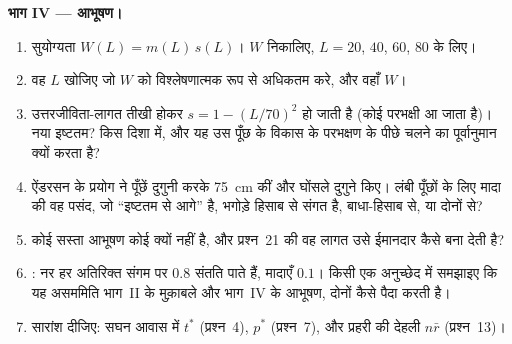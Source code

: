 \begin{problem}
\medskip
\noindent\textbf{भाग IV --- आभूषण।}
\begin{enumerate}[resume]
  \item सुयोग्यता $W(L) = m(L)\,s(L)$। $W$ निकालिए, $L = 20$, $40$, $60$,
        $80$ के लिए।
  \item वह $L$ खोजिए जो $W$ को विश्लेषणात्मक रूप से अधिकतम करे, और वहाँ
        $W$।
  \item उत्तरजीविता-लागत तीखी होकर $s = 1 - (L/70)^{2}$ हो जाती है (कोई
        परभक्षी आ जाता है)। नया इष्टतम? किस दिशा में, और यह उस पूँछ के
        विकास के परभक्षण के पीछे चलने का पूर्वानुमान क्यों करता है?
  \item ऐंडरसन के प्रयोग ने पूँछें दुगुनी करके \qty{75}{cm} कीं और
        घोंसले दुगुने किए। लंबी पूँछों के लिए मादा की वह पसंद, जो
        ``इष्टतम से आगे'' है, भगोड़े हिसाब से संगत है, बाधा-हिसाब से, या
        दोनों से?
  \item कोई सस्ता आभूषण कोई  क्यों नहीं है, और प्रश्न~21
        की वह लागत उसे ईमानदार कैसे बना देती है?
  \item {}: नर हर अतिरिक्त संगम पर $0.8$ संतति पाते हैं,
        मादाएँ $0.1$। किसी एक अनुच्छेद में समझाइए कि यह असममिति भाग~II
        के मुक़ाबले और भाग~IV के आभूषण, दोनों कैसे पैदा करती है।
  \item सारांश दीजिए: सघन आवास में $t^{*}$ (प्रश्न~4), $p^{*}$
        (प्रश्न~7), और प्रहरी की देहली $n\bar r$
        (प्रश्न~13)।
\end{enumerate}
\end{problem}
